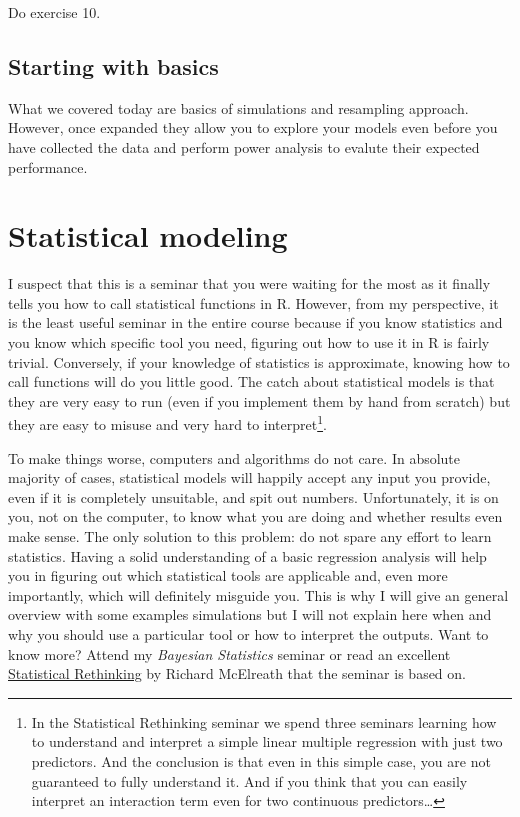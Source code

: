 \documentclass[
]{book}
\begin{document}
Do exercise 10.

\hypertarget{starting-with-basics}{%
\section{Starting with basics}\label{starting-with-basics}}

What we covered today are basics of simulations and resampling approach. However, once expanded they allow you to explore your models even before you have collected the data and perform power analysis to evalute their expected performance.

\hypertarget{statistical-modeling}{%
\chapter{Statistical modeling}\label{statistical-modeling}}

I suspect that this is a seminar that you were waiting for the most as it finally tells you how to call statistical functions in R. However, from my perspective, it is the least useful seminar in the entire course because if you know statistics and you know which specific tool you need, figuring out how to use it in R is fairly trivial. Conversely, if your knowledge of statistics is approximate, knowing how to call functions will do you little good. The catch about statistical models is that they are very easy to run (even if you implement them by hand from scratch) but they are easy to misuse and very hard to interpret\footnote{In the Statistical Rethinking seminar we spend three seminars learning how to understand and interpret a simple linear multiple regression with just two predictors. And the conclusion is that even in this simple case, you are not guaranteed to fully understand it. And if you think that you can easily interpret an interaction term even for two continuous predictors\ldots{}}.

To make things worse, computers and algorithms do not care. In absolute majority of cases, statistical models will happily accept any input you provide, even if it is completely unsuitable, and spit out numbers. Unfortunately, it is on you, not on the computer, to know what you are doing and whether results even make sense. The only solution to this problem: do not spare any effort to learn statistics. Having a solid understanding of a basic regression analysis will help you in figuring out which statistical tools are applicable and, even more importantly, which will definitely misguide you. This is why I will give an general overview with some examples simulations but I will not explain here when and why you should use a particular tool or how to interpret the outputs. Want to know more? Attend my \emph{Bayesian Statistics} seminar or read an excellent \href{https://www.routledge.com/Statistical-Rethinking-A-Bayesian-Course-with-Examples-in-R-and-STAN/McElreath/p/book/9780367139919}{Statistical Rethinking} by Richard McElreath that the seminar is based on.
\end{document}
